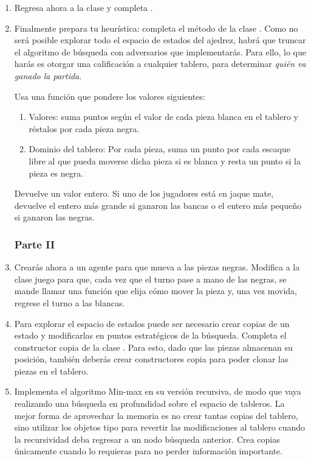 \begin{enumerate}
 \item Regresa ahora a la clase  y completa .

 \item Finalmente prepara tu heurística: completa el método  de la clase .  Como no será posible explorar todo el espacio de estados del ajedrez, habrá que truncar el algoritmo de búsqueda con adversarios que implementarás.  Para ello, lo que harás es otorgar una calificación a cualquier tablero, para determinar \textit{quién va ganado la partida}.

 Usa una función que pondere los valores siguientes:
 \begin{enumerate}
  \item Valores: suma puntos según el valor de cada pieza blanca en el tablero y réstalos por cada pieza negra.

  \item Dominio del tablero:  Por cada pieza, suma un punto por cada escaque libre al que pueda moverse dicha pieza si es blanca y resta un punto si la pieza es negra.
 \end{enumerate}

 Devuelve un valor entero.  Si uno de los jugadores está en jaque mate, devuelve el entero más grande si ganaron las bancas o el entero más pequeño si ganaron las negras.
       
\subsubsection{Parte II}

 \item Crearás ahora a un agente para que mueva a las piezas negras.  Modifica a la clase juego para que, cada vez que el turno pase a mano de las negras, se mande llamar una función que elija cómo mover la pieza y, una vez movida, regrese el turno a las blancas.

 \item Para explorar el espacio de estados puede ser necesario crear copias de un estado y modificarlas en puntos estratégicos de la búsqueda.  Completa el constructor copia de la clase .  Para esto, dado que las piezas almacenan su posición, también deberás crear constructores copia para poder clonar las piezas en el tablero.

 \item Implementa el algoritmo Min-max en su versión recursiva, de modo que vaya realizando una búsqueda en profundidad sobre el espacio de tableros.  La mejor forma de aprovechar la memoria es no crear tantas copias del tablero, sino utilizar los objetos tipo  para revertir las modificaciones al tablero cuando la recursividad deba regresar a un nodo búsqueda anterior.  Crea copias únicamente cuando lo requieras para no perder información importante.


\end{enumerate}
